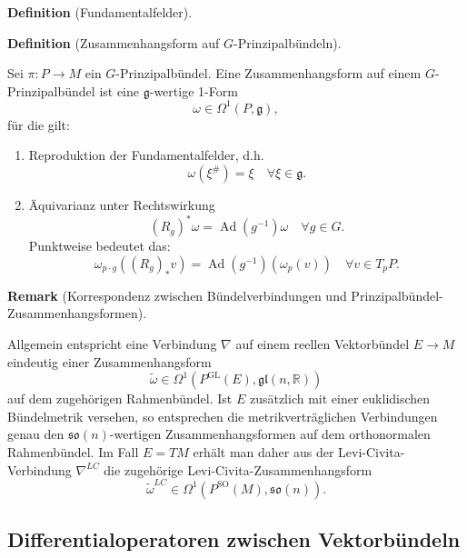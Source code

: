 \documentclass[10pt, letterpaper]{article}
\newcommand{\R}{\mathbb{R}}
\newcommand{\GL}{\mathrm{GL}}
\newcommand{\SO}{\mathrm{SO}}
\newcommand{\CustomHeading}[3]{%
  \par\medskip\noindent%
  \textbf{#1 #2} \textnormal{(#3)}.\enskip%
}
\newenvironment{DEF}[2]{\CustomHeading{Definition}{#1}{#2}}{}
\newenvironment{REM}[2]{\CustomHeading{Remark}{#1}{#2}}{}
\begin{document}
\begin{DEF}{}{{\color{blue}Fundamentalfelder}}
  
\end{DEF}

\begin{DEF}{}{Zusammenhangsform auf $G$-Prinzipalbündeln}
  Sei $\pi:P\to M$ ein $G$-Prinzipalbündel. Eine Zusammenhangsform auf einem $G$-Prinzipalbündel ist eine $\mathfrak{g}$-wertige 1-Form
  $$
  \omega \in \Omega^1(P, \mathfrak{g}),
  $$
  für die gilt:
  \begin{enumerate}
    \item Reproduktion der Fundamentalfelder, d.h. 
    $$
    \omega\left(\xi^{\#}\right)=\xi \quad \forall \xi \in \mathfrak{g} .
    $$
    \item Äquivarianz unter Rechtswirkung
    $$
    \left(R_g\right)^* \omega=\operatorname{Ad}\left(g^{-1}\right) \omega \quad \forall g \in G .
    $$
    Punktweise bedeutet das:
    $$
    \omega_{p \cdot g}\left(\left(R_g\right)_* v\right)=\operatorname{Ad}\left(g^{-1}\right)\left(\omega_p(v)\right) \quad \forall v \in T_p P .
    $$
  \end{enumerate}
\end{DEF}


{\color{blue}\begin{REM}{}{Korrespondenz zwischen Bündelverbindungen und Prinzipalbündel-Zusammenhangsformen}
Allgemein entspricht eine Verbindung \(\nabla\) auf einem reellen Vektorbündel
\(E\to M\) eindeutig einer Zusammenhangsform
\[
\widetilde\omega\in \Omega^1(P^{\GL}(E),\mathfrak{gl}(n,\R))
\]
auf dem zugehörigen Rahmenbündel. Ist \(E\) zusätzlich mit einer euklidischen
Bündelmetrik versehen, so entsprechen die metrikverträglichen Verbindungen genau
den \(\mathfrak{so}(n)\)-wertigen Zusammenhangsformen auf dem orthonormalen
Rahmenbündel. Im Fall \(E=TM\) erhält man daher aus der Levi-Civita-Verbindung
\(\nabla^{LC}\) die zugehörige Levi-Civita-Zusammenhangsform
\[
\widetilde\omega^{LC}\in \Omega^1(P^{\SO}(M),\mathfrak{so}(n)).
\]
\end{REM}}

\subsection{Differentialoperatoren zwischen Vektorbündeln}
\end{document}

